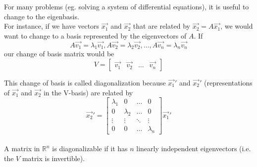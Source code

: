 \begin{enumerate}



  \bigskip

  \begin{adjustwidth}{-20pt}{0pt}

    For many problems (eg. solving a system of differential equations), it is useful to change to the eigenbasis. \\
    For instance, if we have vectors $\vec{x_1}$ and $\vec{x_2}$ that are related by $\vec{x_2} = A \vec{x_1}$, we would want to change to a basis represented by the eigenvectors of $A$.
    If $$A \vec{v_1} = \lambda_1 \vec{v_1}, A \vec{v_2} = \lambda_2 \vec{v_2}, \dots, A\vec{v_n} = \lambda_n \vec{v_n} $$
    our change of basis matrix would be
    $$ V =
    \begin{bmatrix}
      \vec{v_1} & \vec{v_2} & \dots & \vec{v_n}
    \end{bmatrix}
    $$

    This change of basis is called diagonalization because $\vec{x_1}'$ and $\vec{x_2}'$ (representations of $\vec{x_1}$ and $\vec{x_2}$ in the V-basis) are related by
    $$ \vec{x_2}' =
    \begin{bmatrix}
      \lambda_1 & 0 & \dots & 0 \\
      0 & \lambda_2 & \dots & 0 \\
      \vdots & \vdots & \ddots & \vdots \\
      0 & 0 & \dots & \lambda_n
    \end{bmatrix} \vec{x_1}'
    $$ \\
    A matrix in $\mathbb{R}^{n}$ is diagonalizable if it has $n$ linearly independent eigenvectors (i.e. the $V$ matrix is invertible).

  \end{adjustwidth}


\end{enumerate}
